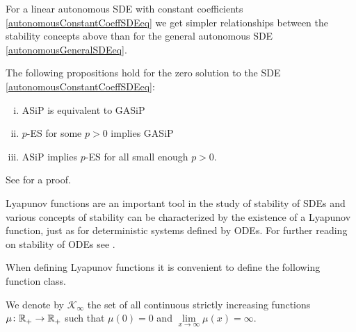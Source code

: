 \documentclass[a4paper,12pt,twoside,BCOR=10mm]{scrbook}
\begin{document}
For a linear autonomous SDE with constant coefficients \eqref{autonomousConstantCoeffSDEeq} we get simpler relationships between the stability concepts above than for the general autonomous SDE \eqref{autonomousGeneralSDEeq}.

\begin{theorem}
    The following propositions hold for the zero solution to the SDE \eqref{autonomousConstantCoeffSDEeq}:
    
    \begin{enumerate}[i)]
        \item ASiP is equivalent to GASiP
        \item $p$-ES for some $p>0$ implies GASiP
        \item ASiP implies $p$-ES for all small enough $p>0$.
    \end{enumerate}
\end{theorem}

See \citep{HGGS2018localLya} for a proof.


\fi

Lyapunov functions are an important tool in the study of stability of SDEs and various concepts of stability can be characterized by the existence of a Lyapunov function, just as for deterministic systems defined by ODEs. For further reading on stability of ODEs see \citep{Hahn1967, vidya2002, Khalil1992, sastry1999}.

When defining Lyapunov functions it is convenient to define the following function class.

\begin{definition}
    We denote by $\mathcal{K}_\infty$ the set of all continuous strictly increasing functions $\mu\colon \mathbb{R}^{}_+ \to \mathbb{R}^{}_+$ such that $\mu(0) = 0$ and $\lim\limits_{x \to \infty} \mu(x) = \infty$.
\end{definition}
\end{document}
